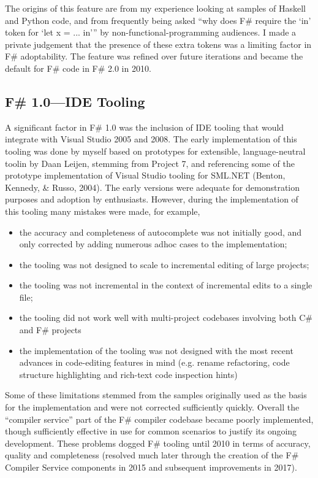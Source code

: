\documentclass[acmsmall]{acmart}\settopmatter{}
\begin{document}
The origins of this feature are from my experience looking at samples of Haskell and Python code, and from frequently
being asked “why does F\# require the ‘in’ token for ‘let x = ... in’” by non-functional-programming audiences.  I made
a private judgement that the presence of these extra tokens was a limiting factor in F\# adoptability.  The feature was refined
over future iterations and became the default for F\# code in F\# 2.0 in 2010.

\subsection*{F\# 1.0---IDE Tooling}

A significant factor in F\# 1.0 was the inclusion of IDE tooling that would integrate with Visual Studio 2005 and 2008.
The early implementation of this tooling was done by myself based on prototypes for extensible, language-neutral toolin
 by Daan Leijen, stemming from Project 7, and referencing some of the prototype implementation of Visual Studio tooling
for SML.NET (Benton, Kennedy, \& Russo, 2004). The early versions were adequate for demonstration purposes and
adoption by enthusiasts.  However, during the implementation of this tooling many mistakes were made, for example, 

\begin{itemize}
\item the accuracy and completeness of autocomplete was not initially good, and only corrected by adding numerous adhoc cases to the implementation;
\item the tooling was not designed to scale to incremental editing of large projects;
\item the tooling was not incremental in the context of incremental edits to a single file;
\item the tooling did not work well with multi-project codebases involving both C\# and F\# projects
\item the implementation of the tooling was not designed with the most recent advances in code-editing features in mind (e.g. rename refactoring, code structure highlighting and rich-text code inspection hints) 
\end{itemize}

Some of these limitations stemmed from the samples originally used as the basis for the implementation and were not
corrected sufficiently quickly.  Overall the “compiler service” part of the F\# compiler codebase became poorly implemented,
though sufficiently effective in use for common scenarios to justify its ongoing development.  These problems
dogged F\# tooling until 2010 in terms of accuracy, quality and completeness (resolved much later
through the creation of the F\# Compiler Service components in 2015 and subsequent improvements in 2017).
\end{document}
